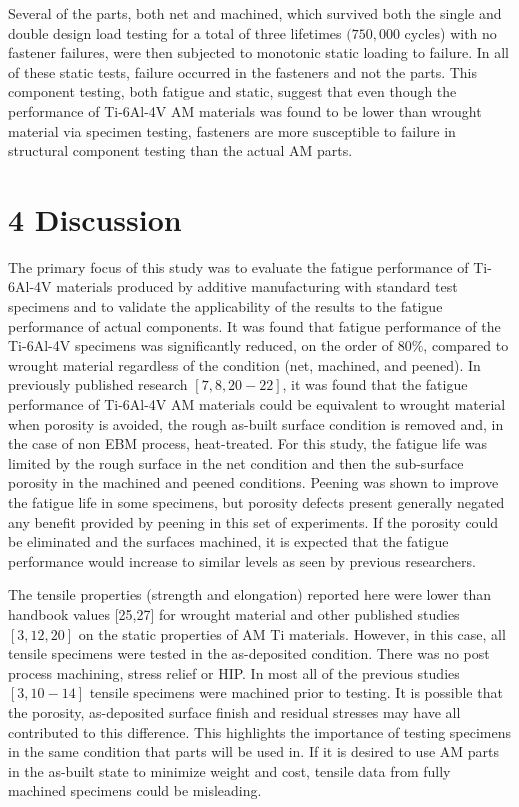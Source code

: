 \documentclass[10pt]{article}
\begin{document}
Several of the parts, both net and machined, which survived both the single and double design load testing for a total of three lifetimes $(750,000$ cycles) with no fastener failures, were then subjected to monotonic static loading to failure. In all of these static tests, failure occurred in the fasteners and not the parts. This component testing, both fatigue and static, suggest that even though the performance of Ti-6Al-4V AM materials was found to be lower than wrought material via specimen testing, fasteners are more susceptible to failure in structural component testing than the actual AM parts.

\section*{4 Discussion}
The primary focus of this study was to evaluate the fatigue performance of Ti-6Al-4V materials produced by additive manufacturing with standard test specimens and to validate the applicability of the results to the fatigue performance of actual components. It was found that fatigue performance of the Ti-6Al-4V specimens was significantly reduced, on the order of $80 \%$, compared to wrought material regardless of the condition (net, machined, and peened). In previously published research $[7,8,20-22]$, it was found that the fatigue performance of Ti-6Al-4V AM materials could be equivalent to wrought material when porosity is avoided, the rough as-built surface condition is removed and, in the case of non EBM process, heat-treated. For this study, the fatigue life was limited by the rough surface in the net condition and then the sub-surface porosity in the machined and peened conditions. Peening was shown to improve the fatigue life in some specimens, but porosity defects present generally negated any benefit provided by peening in this set of experiments. If the porosity could be eliminated and the surfaces machined, it is expected that the fatigue performance would increase to similar levels as seen by previous researchers.

The tensile properties (strength and elongation) reported here were lower than handbook values [25,27] for wrought material and other published studies $[3,12,20]$ on the static properties of AM Ti materials. However, in this case, all tensile specimens were tested in the as-deposited condition. There was no post process machining, stress relief or HIP. In most all of the previous studies $[3,10-14]$ tensile specimens were machined prior to testing. It is possible that the porosity, as-deposited surface finish and residual stresses may have all contributed to this difference. This highlights the importance of testing specimens in the same condition that parts will be used in. If it is desired to use AM parts in the as-built state to minimize weight and cost, tensile data from fully machined specimens could be misleading.
\end{document}
